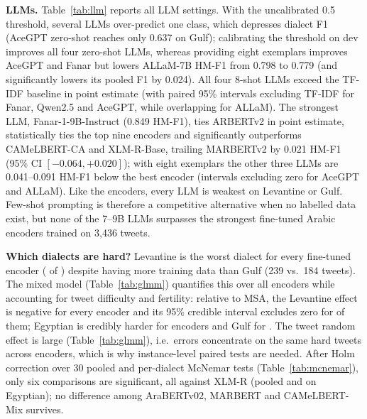\documentclass[11pt]{article}
\begin{document}
\textbf{LLMs.} Table~\ref{tab:llm} reports all LLM settings. With the uncalibrated 0.5 threshold, several LLMs over-predict one class, which depresses dialect F1 (AceGPT zero-shot reaches only 0.637 on Gulf); calibrating the threshold on dev improves all four zero-shot LLMs, whereas providing eight exemplars improves AceGPT and Fanar but lowers ALLaM-7B HM-F1 from 0.798 to 0.779 (and significantly lowers its pooled F1 by 0.024). All four 8-shot LLMs exceed the TF-IDF baseline in point estimate (with paired 95\% intervals excluding TF-IDF for Fanar, Qwen2.5 and AceGPT, while overlapping for ALLaM). The strongest LLM, Fanar-1-9B-Instruct (0.849 HM-F1), ties ARBERTv2 in point estimate, statistically ties the top nine encoders and significantly outperforms CAMeLBERT-CA and XLM-R-Base, trailing MARBERTv2 by 0.021 HM-F1 (95\% CI $[-0.064, +0.020]$); with eight exemplars the other three LLMs are 0.041--0.091 HM-F1 below the best encoder (intervals excluding zero for AceGPT and ALLaM). Like the encoders, every LLM is weakest on Levantine or Gulf. Few-shot prompting is therefore a competitive alternative when no labelled data exist, but none of the 7--9B LLMs surpasses the strongest fine-tuned Arabic encoders trained on 3,436 tweets.

\begin{table}[tbp]
\caption{Instruction-tuned LLMs on the leak-free test set: zero-shot (threshold 0.5), zero-shot with a dev-selected threshold, and 8-shot (one positive and one negative exemplar per dialect; mean over three exemplar draws). Last column: HM-F1 difference to the best fine-tuned encoder (PID) with 95\% paired bootstrap interval.}
\label{tab:llm}
\centering
\footnotesize
\setlength{\tabcolsep}{2.6pt}
\end{table}

\textbf{Which dialects are hard?} Levantine is the worst dialect for every fine-tuned encoder (\levWorstN{} of \nEnc) despite having more training data than Gulf (239 vs.\ 184 tweets). The mixed model (Table~\ref{tab:glmm}) quantifies this over all \glmmNmodels{} encoders while accounting for tweet difficulty and fertility: relative to MSA, the Levantine effect is negative for every encoder and its 95\% credible interval excludes zero for \glmmNegLEV{} of them; Egyptian is credibly harder for \glmmNegEGY{} encoders and Gulf for \glmmNegGLF. The tweet random effect is large (Table~\ref{tab:glmm}), i.e.\ errors concentrate on the same hard tweets across encoders, which is why instance-level paired tests are needed. After Holm correction over 30 pooled and per-dialect McNemar tests (Table~\ref{tab:mcnemar}), only six comparisons are significant, all against XLM-R (pooled and on Egyptian); no difference among AraBERTv02, MARBERT and CAMeLBERT-Mix survives.
\end{document}
